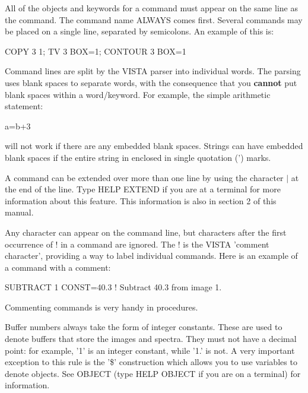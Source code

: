 All of the objects and keywords for a command must appear on the same line
as the command.  The command name ALWAYS comes first.  Several commands may
be placed on a single line, separated by semicolons.  An example of this
is:
\begin{hanging}
   \item{COPY 3 1; TV 3 BOX=1; CONTOUR 3 BOX=1}
\end{hanging}

Command lines are split by the VISTA parser into individual words.  The
parsing uses blank spaces to separate words, with the consequence that you
\textbf{cannot} put blank spaces within a word/keyword. For example, the
simple arithmetic statement:
\begin{hanging}
   \item{a=b+3}
\end{hanging}
will not work if there are any embedded blank spaces. Strings can have
embedded blank spaces if the entire string in enclosed in single quotation
(') marks.

A command can be extended over more than one line by using the character
$|$ at the end of the line.  Type HELP EXTEND if you are at a terminal for
more information about this feature.  This information is also in section 2
of this manual.

Any character can appear on the command line, but characters after the
first occurrence of ! in a command are ignored.  The ! is the VISTA
'comment character', providing a way to label individual commands.  Here is
an example of a command with a comment:
\begin{hanging}
   \item{SUBTRACT 1 CONST=40.3  ! Subtract 40.3 from image 1.}
\end{hanging}
Commenting commands is very handy in procedures. 

Buffer numbers always take the form of integer constants.  These are used
to denote buffers that store the images and spectra.  They must not have a
decimal point: for example, '1' is an integer constant, while '1.' is not.
A very important exception to this rule is the '\$' construction which
allows you to use variables to denote objects.  See OBJECT (type HELP
OBJECT if you are on a terminal) for information.

